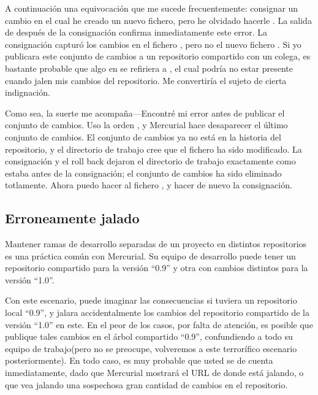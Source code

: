 A continuación una equivocación que me sucede frecuentemente:
consignar un cambio en el cual he creado un nuevo fichero, pero he
olvidado hacerle .
La salida de  después de la consignación confirma
inmediatamente este error.
La consignación capturó los cambios en el fichero , pero
no el nuevo fichero .  Si yo publicara este conjunto de
cambios a un repositorio compartido con un colega, es bastante
probable que algo en  se refiriera a , el cual
podría no estar presente cuando jalen mis cambios del repositorio.  Me
convertiría el sujeto de cierta indignación.

Como sea, la suerte me acompaña---Encontré mi error antes de publicar
el conjunto de cambios.  Uso la orden , y Mercurial
hace desaparecer el último conjunto de cambios.
El conjunto de cambios ya no está en la historia del repositorio, y el
directorio de trabajo cree que el fichero  ha sido
modificado.  La consignación y el roll back dejaron el directorio de
trabajo exactamente como estaba antes de la consignación; el conjunto
de cambios ha sido eliminado totlamente. Ahora puedo hacer 
al fichero , y hacer de nuevo la consignación.

\subsection{Erroneamente jalado}

Mantener ramas de desarrollo separadas de un proyecto en distintos
repositorios es una práctica común con Mercurial.  Su equipo de
desarrollo puede tener un repositorio compartido para la versión ``0.9''
y otra con cambios distintos para la versión ``1.0''.

Con este escenario, puede imaginar las consecuencias si tuviera un
repositorio local ``0.9'', y jalara accidentalmente los cambios del
repositorio compartido de la versión ``1.0'' en este.  En el peor de
los casos, por falta de atención, es posible que publique tales
cambios en el árbol compartido ``0.9'', confundiendo a todo su equipo
de trabajo(pero no se preocupe, volveremos a este terrorífico
escenario posteriormente).  En todo caso, es muy probable que usted se
de cuenta inmediatamente, dado que Mercurial mostrará el URL de donde
está jalando, o que vea jalando una sospechosa gran cantidad de
cambios en el repositorio.

